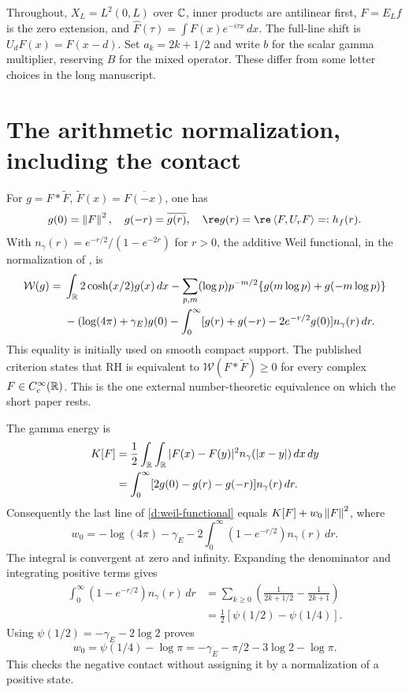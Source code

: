 Throughout, $X_L=L^2(0,L)$ over $\mathbb C$, inner products are antilinear first,
$F=E_Lf$ is the zero extension, and
$\widehat F(\tau)=\int F(x)e^{-i\tau x}\,dx$.
The full-line shift is $U_dF(x)=F(x-d)$.
Set $a_k=2k+1/2$ and write $b$ for the scalar gamma multiplier, reserving
$B$ for the mixed operator. These differ from some letter choices in the
long manuscript.

\section{The arithmetic normalization, including the contact}
For $g=F*\widetilde F$, $\widetilde F(x)=\overline{F(-x)}$, one has
\[
g(0)=\norm F^2,\quad g(-r)=\overline{g(r)},\quad
\re g(r)=\re\ip F{U_rF}=:h_f(r).
\]
With $n_\gamma(r)=e^{-r/2}/(1-e^{-2r})$ for $r>0$, the additive
Weil functional, in the normalization of \cite[Section 1.1]{Suzuki}, is
\begin{align}
\mathcal W(g)={}&\int_\mathbb R 2\cosh(x/2)g(x)\,dx
-\sum_{p,m}(\log p)p^{-m/2}\{g(m\log p)+g(-m\log p)\}\notag\\
&-(\log(4\pi)+\gamma_E)g(0)
-\int_0^\infty[g(r)+g(-r)-2e^{-r/2}g(0)]n_\gamma(r)\,dr.
\label{d:weil-functional}
\end{align}
This equality is initially used on smooth compact support. The published
criterion states that RH is equivalent to $\mathcal W(F*\widetilde F)\ge0$
for every complex $F\in C_c^\infty(\mathbb R)$. This is the one external
number-theoretic equivalence on which the short paper rests.

The gamma energy is
\begin{align}
K[F]&=\frac12\int_\mathbb R\int_\mathbb R
 |F(x)-F(y)|^2n_\gamma(|x-y|)\,dx\,dy\notag\\
&=\int_0^\infty[2g(0)-g(r)-g(-r)]n_\gamma(r)\,dr.
\end{align}
Consequently the last line of \eqref{d:weil-functional} equals
$K[F]+w_0\left\lVert F\right\rVert^2$, where
\[
w_0=-\log(4\pi)-\gamma_E
-2\int_0^\infty(1-e^{-r/2})n_\gamma(r)\,dr.
\]
The integral is convergent at zero and infinity. Expanding the denominator
and integrating positive terms gives
\begin{align*}
\int_0^\infty(1-e^{-r/2})n_\gamma(r)\,dr
&=\sum_{k\ge0}\left(\frac1{2k+1/2}-\frac1{2k+1}\right)\\
&=\tfrac12[\psi(1/2)-\psi(1/4)].
\end{align*}
Using $\psi(1/2)=-\gamma_E-2\log2$ proves
\begin{equation}\label{d:contact}
w_0=\psi(1/4)-\log\pi
=-\gamma_E-\pi/2-3\log2-\log\pi.
\end{equation}
This checks the negative contact without assigning it by a normalization
of a positive state.

